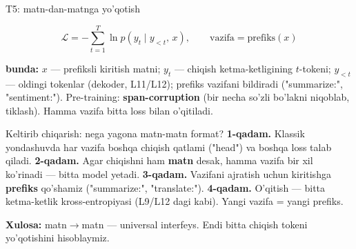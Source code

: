 \documentclass[aspectratio=169,11pt]{beamer}
\newcommand{\bunda}[1]{{\small\textbf{bunda:}\; #1}}
\begin{document}
\begin{frame}{T5: matn-dan-matnga yo'qotish}
  \begin{tcolorbox}[defbox,title={Ta'rif: ketma-ketlik kross-entropiyasi}]
    \vspace{-0.4em}
    $$ \mathcal{L} = -\sum_{t=1}^{T}\ln p(y_t \mid y_{<t},\, x), \qquad
       \text{vazifa} = \text{prefiks}(x) $$
  \end{tcolorbox}
  \vspace{2pt}
  \bunda{$x$ --- prefiksli kiritish matni; $y_t$ --- chiqish ketma-ketligining
  $t$-tokeni; $y_{<t}$ --- oldingi tokenlar (dekoder, L11/L12); prefiks vazifani
  bildiradi ("summarize:", "sentiment:").}
  \vspace{4pt}
  \footnotesize Pre-training: \textbf{span-corruption} (bir necha so'zli bo'lakni
  niqoblab, tiklash). Hamma vazifa bitta loss bilan o'qitiladi.
\end{frame}

\begin{frame}{Keltirib chiqarish: nega yagona matn-matn format?}
  \textbf{1-qadam.} Klassik yondashuvda har vazifa boshqa chiqish qatlami
  ("head") va boshqa loss talab qiladi.
  \pause
  \textbf{2-qadam.} Agar chiqishni ham \textbf{matn} desak, hamma vazifa bir xil
  ko'rinadi --- bitta model yetadi.
  \pause
  \textbf{3-qadam.} Vazifani ajratish uchun kiritishga \textbf{prefiks}
  qo'shamiz ("summarize:", "translate:").
  \pause
  \textbf{4-qadam.} O'qitish --- bitta ketma-ketlik kross-entropiyasi (L9/L12
  dagi kabi). Yangi vazifa = yangi prefiks.
  \begin{tcolorbox}[okbox,top=2pt,bottom=2pt]
    \small \textbf{Xulosa:} matn$\to$matn --- universal interfeys. Endi bitta
    chiqish tokeni yo'qotishini hisoblaymiz.
  \end{tcolorbox}
\end{frame}
\end{document}
